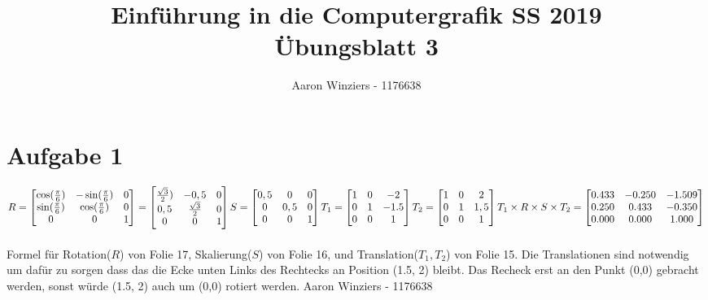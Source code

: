 \documentclass[11pt,a4paper,parskip=half ]{scrartcl}
\author{Aaron Winziers - 1176638}
\title{Einführung in die Computergrafik SS 2019\\\LARGE{Übungsblatt 3}}
\begin{document}
	\maketitle
	
	\section*{Aufgabe 1}
$
R = 
\begin{bmatrix}
    \cos(\frac{\pi}{6}) & -\sin(\frac{\pi}{6}) & 0	\\
    \sin(\frac{\pi}{6}) & \cos(\frac{\pi}{6}) & 0	\\
    0 & 0 & 1	\\
\end{bmatrix}= 
\begin{bmatrix}
\frac{\sqrt{3}}{2}) & -0,5 & 0	\\
0,5 & \frac{\sqrt{3}}{2} & 0	\\
0 & 0 & 1	\\
\end{bmatrix}
\newline
S = 
\begin{bmatrix}
0,5 & 0 & 0	\\
0 & 0,5 & 0	\\
0 & 0 & 1	\\
\end{bmatrix}
\newline
T_{1} = 
\begin{bmatrix}
1 & 0 & -2	\\
0 & 1 & -1.5	\\
0 & 0 & 1	\\
\end{bmatrix}
\newline
T_{2} = 
\begin{bmatrix}
1 & 0 & 2	\\
0 & 1 & 1,5	\\
0 & 0 & 1	\\
\end{bmatrix}
\newline
T_{1}\times R\times S\times T_{2} =
\begin{bmatrix}
0.433 & -0.250 & -1.509 \\
0.250 & 0.433 & -0.350 \\
0.000 & 0.000 & 1.000
\end{bmatrix}
$\\
\vspace{.5cm}\\
Formel für Rotation($R$) von Folie 17, Skalierung($S$) von Folie 16, und Translation($T_1, T_2$) von Folie 15. Die Translationen sind notwendig um dafür zu sorgen dass das die Ecke unten Links des Rechtecks an Position (1.5, 2) bleibt. Das Recheck erst an den Punkt (0,0) gebracht werden, sonst würde (1.5, 2) auch um (0,0) rotiert werden.
\newpage
Aaron Winziers - 1176638
\end{document}
